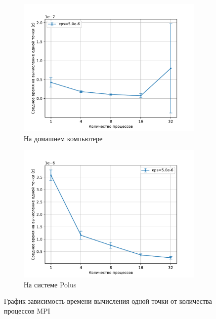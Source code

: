 \documentclass{article}
\begin{document}
\begin{figure}[!t]
\centering
\begin{subfigure}[b]{0.49\textwidth}
    \centering
    \includegraphics[width=\textwidth,trim=0 0 0 0,clip]{5.0e-6_home_pc_time_pp.pdf}
    \caption{На домашнем компьютере}
    \label{img:2.1}
\end{subfigure}
\begin{subfigure}[b]{0.49\textwidth}
    \centering
    \includegraphics[width=\textwidth,trim=0 0 0 0,clip]{5.0e-6_polus_time_pp.pdf}
    \caption{На системе Polus}
    \label{img:2.2}
\end{subfigure}
\caption{График зависимость времени вычисления одной точки от количества процессов MPI}
\end{figure}
\end{document}
